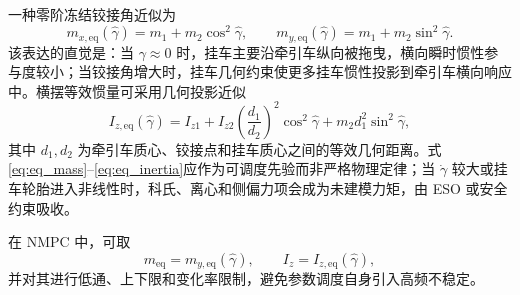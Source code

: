 \documentclass[UTF8,zihao=-4]{ctexrep}
\begin{document}
一种零阶冻结铰接角近似为
\begin{equation}
    m_{x,\mathrm{eq}}(\hat\gamma)=m_1+m_2\cos^2\hat\gamma,
    \qquad
    m_{y,\mathrm{eq}}(\hat\gamma)=m_1+m_2\sin^2\hat\gamma.
    \label{eq:eq_mass}
\end{equation}
该表达的直觉是：当 $\gamma\approx 0$ 时，挂车主要沿牵引车纵向被拖曳，横向瞬时惯性参与度较小；当铰接角增大时，挂车几何约束使更多挂车惯性投影到牵引车横向响应中。横摆等效惯量可采用几何投影近似
\begin{equation}
    I_{z,\mathrm{eq}}(\hat\gamma)=I_{z1}+I_{z2}\left(\frac{d_1}{d_2}\right)^2\cos^2\hat\gamma+m_2d_1^2\sin^2\hat\gamma,
    \label{eq:eq_inertia}
\end{equation}
其中 $d_1,d_2$ 为牵引车质心、铰接点和挂车质心之间的等效几何距离。式\eqref{eq:eq_mass}--\eqref{eq:eq_inertia}应作为可调度先验而非严格物理定律；当 $\dot\gamma$ 较大或挂车轮胎进入非线性时，科氏、离心和侧偏力项会成为未建模力矩，由 ESO 或安全约束吸收。

在 NMPC 中，可取
\begin{equation}
    m_{\mathrm{eq}}=m_{y,\mathrm{eq}}(\hat\gamma),\qquad I_z=I_{z,\mathrm{eq}}(\hat\gamma),
\end{equation}
并对其进行低通、上下限和变化率限制，避免参数调度自身引入高频不稳定。
\end{document}
